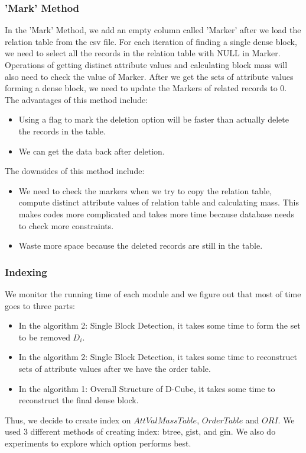 \subsubsection{'Mark' Method}
In the 'Mark' Method, we add an empty column called 'Marker' after we load the relation table from the csv file. For each iteration of finding a single dense block, we need to select all the records in the relation table with NULL in Marker. Operations of getting distinct attribute values and calculating block mass will also need to check the value of Marker. After we get the sets of attribute values forming a dense block, we need to update the Markers of related records to 0. \\
The advantages of this method include:
\begin{itemize}
    \item Using a flag to mark the deletion option will be faster than actually delete the records in the table.
    \item We can get the data back after deletion.
\end{itemize}
The downsides of this method include:
\begin{itemize}
    \item We need to check the markers when we try to copy the relation table, compute distinct attribute values of relation table and calculating mass. This makes codes more complicated and takes more time because database needs to check more constraints.
    \item Waste more space because the deleted records are still in the table.
\end{itemize}

\subsubsection{Indexing}
We monitor the running time of each module and we figure out that most of time goes to three parts: 
\begin{itemize}
    \item In the algorithm 2: Single Block Detection, it takes some time to form the set to be removed $D_i$.
    \item In the algorithm 2: Single Block Detection, it takes some time to reconstruct sets of attribute values after we have the order table.
    \item In the algorithm 1: Overall Structure of D-Cube, it takes some time to reconstruct the final dense block.
\end{itemize}
Thus, we decide to create index on $AttValMassTable$, $OrderTable$ and $ORI$. We used 3 different methods of creating index: btree, gist, and gin. We also do experiments to explore which option performs best. \\

